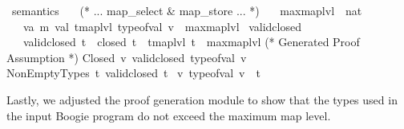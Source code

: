 \begin{isabellebody}\isanewline
{}\isamarkupfalse%
\ semantics\ {\isacharequal}{\kern0pt}\isanewline
\ \ (* ... map\_select \& map\_store ... *) \isanewline
\ \ \ maxmaplvl\ {\isacharcolon}{\kern0pt}{\isacharcolon}{\kern0pt}\ nat\isanewline
\ \ \ {\isachardoublequoteopen}{\isasymAnd}v{\isacharcolon}{\kern0pt}{\isacharcolon}{\kern0pt}{\isacharparenleft}{\kern0pt}{\isacharprime}{\kern0pt}a{\isacharcomma}{\kern0pt}\ {\isacharprime}{\kern0pt}m{\isacharparenright}{\kern0pt}\ val{\isachardot}{\kern0pt}\ tmap{\isacharunderscore}{\kern0pt}lvl\ {\isacharparenleft}{\kern0pt}type{\isacharunderscore}{\kern0pt}of{\isacharunderscore}{\kern0pt}val\ v{\isacharparenright}{\kern0pt}\ {\isasymle}\ maxmaplvl{\isachardoublequoteclose}\isanewline
{}\isanewline
\isanewline
\isamarkupfalse%
\ valid{\isacharunderscore}{\kern0pt}closed\isanewline
\ \ \ {\isachardoublequoteopen}valid{\isacharunderscore}{\kern0pt}closed\ t\ {\isasymequiv}\ {\isacharparenleft}{\kern0pt}closed\ t\ {\isasymand}\ tmap{\isacharunderscore}{\kern0pt}lvl\ t\ {\isasymle}\ maxmaplvl{\isacharparenright}{\kern0pt}{\isachardoublequoteclose}\isanewline
\isanewline
(* Generated Proof Assumption *) \isanewline
Closed{\isacharcolon}{\kern0pt}\ {\isachardoublequoteopen}{\kern0pt}{\isasymAnd}{\kern0pt}v{\isachardot}{\kern0pt}\ valid{\isacharunderscore}{\kern0pt}closed\ {\isacharparenleft}{\kern0pt}type{\isacharunderscore}{\kern0pt}of{\isacharunderscore}{\kern0pt}val\ v{\isacharparenright}{\kern0pt}{\isachardoublequoteclose}\isanewline
NonEmptyTypes{\isacharcolon}{\kern0pt}\ {\isachardoublequoteopen}{\isasymAnd}t{\isachardot}{\kern0pt}\ {\isacharparenleft}{\kern0pt}{\isacharparenleft}{\kern0pt}valid{\isacharunderscore}{\kern0pt}closed\ t{\isacharparenright}{\kern0pt}
{\isasymLongrightarrow}\ {\isacharparenleft}{\kern0pt}{\isasymexists}v{\isachardot}{\kern0pt}\ type{\isacharunderscore}{\kern0pt}of{\isacharunderscore}{\kern0pt}val\ v\ {\isacharequal}{\kern0pt}\ t{\isacharparenright}{\kern0pt}{\isacharparenright}{\kern0pt}{\isachardoublequoteclose}\ \isanewline
\end{isabellebody}


Lastly, we adjusted the proof generation module to show that the types used in the input Boogie program do not exceed the maximum map level.


